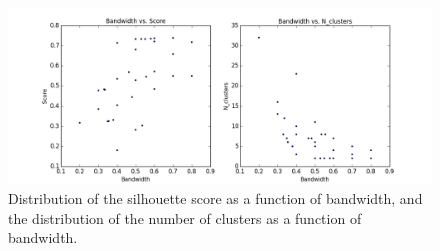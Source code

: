 \begin{figure}[H]
\centering
\includegraphics[width=\linewidth]{figs/meanshift_parameters}
\caption{Distribution of the silhouette score as a function of bandwidth, and the distribution of the number of clusters as a function of bandwidth.}
\label{fig:bwscore}
\end{figure}
